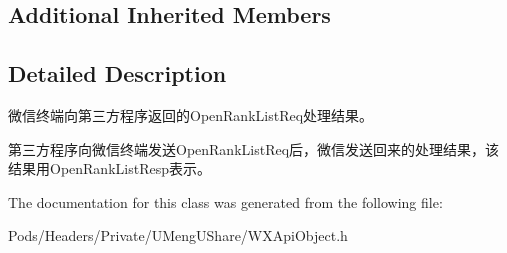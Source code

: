 \subsection*{Additional Inherited Members}


\subsection{Detailed Description}
微信终端向第三方程序返回的\+Open\+Rank\+List\+Req处理结果。 

第三方程序向微信终端发送\+Open\+Rank\+List\+Req后，微信发送回来的处理结果，该结果用\+Open\+Rank\+List\+Resp表示。 

The documentation for this class was generated from the following file\+:\begin{DoxyCompactItemize}
\item 
Pods/\+Headers/\+Private/\+U\+Meng\+U\+Share/W\+X\+Api\+Object.\+h\end{DoxyCompactItemize}

